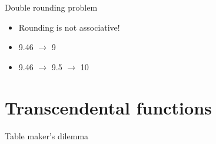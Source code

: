 \documentclass{beamer}
\begin{document}
\begin{frame}{Double rounding problem}
    \begin{itemize}
        \item Rounding is not associative!
        \item 9.46 $\to$ 9
        \item 9.46 $\to$ 9.5 $\to$ 10
    \end{itemize}
\end{frame}

\section{Transcendental functions}
\begin{frame}{Table maker's dilemma}
\end{frame}
\end{document}
